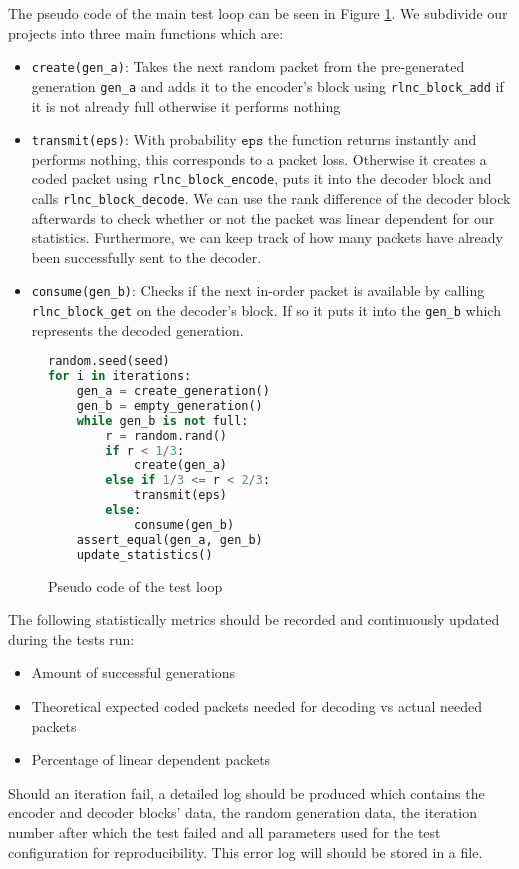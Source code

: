 \documentclass[a4paper,english,10pt]{tumarticle}
\begin{document}
The pseudo code of the main test loop can be seen in Figure \ref{code}. We subdivide our projects
into three main functions which are:

\begin{itemize}
    \setlength{\itemsep}{1pt}
	\setlength{\parskip}{0pt}
	\setlength{\parsep}{0pt}
    \item \texttt{create(gen\_a)}: Takes the next random packet from the pre-generated generation
    \texttt{gen\_a} and adds it to the encoder's block using \texttt{rlnc\_block\_add} if it is not
    already full otherwise it performs nothing
    \item \texttt{transmit(eps)}: With probability $\texttt{eps}$ the function returns instantly and
    performs nothing, this corresponds to a packet loss. Otherwise it creates a coded packet using
    \texttt{rlnc\_block\_encode}, puts it into the decoder block and calls
    \texttt{rlnc\_block\_decode}. We can use the rank difference of the decoder block afterwards to
    check whether or not the packet was linear dependent for our statistics. Furthermore, we can
    keep track of how many packets have already been successfully sent to the decoder.
    \item \texttt{consume(gen\_b)}: Checks if the next in-order packet is available by calling
    \texttt{rlnc\_block\_get} on the decoder's block. If so it puts it into the \texttt{gen\_b}
    which represents the decoded generation.
\end{itemize}


\begin{figure}[h]
  \begin{lstlisting}[language=Python]
random.seed(seed)
for i in iterations:
    gen_a = create_generation()
    gen_b = empty_generation()
    while gen_b is not full:
        r = random.rand()
        if r < 1/3:
            create(gen_a)
        else if 1/3 <= r < 2/3:
            transmit(eps)
        else:
            consume(gen_b)
    assert_equal(gen_a, gen_b)
    update_statistics()
\end{lstlisting}
  \caption[]{Pseudo code of the test loop}
  \label{code}
\end{figure}

The following statistically metrics should be recorded and continuously updated during the tests
run:
\begin{itemize}
    \setlength{\itemsep}{1pt}
	\setlength{\parskip}{0pt}
	\setlength{\parsep}{0pt}
    \item Amount of successful generations
    \item Theoretical expected coded packets needed for decoding vs actual needed packets
    \item Percentage of linear dependent packets
\end{itemize}
Should an iteration fail, a detailed log should be produced which contains the encoder and decoder
blocks' data, the random generation data, the iteration number after which the test failed and all
parameters used for the test configuration for reproducibility. This error log will should be stored
in a file.
\end{document}

